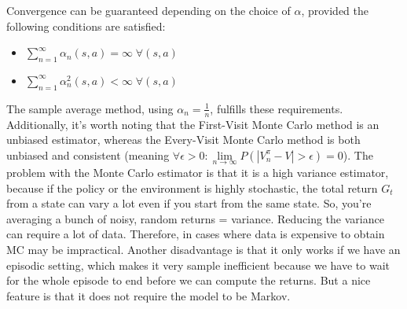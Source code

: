 Convergence can be guaranteed depending on the choice of $\alpha$, provided the 
following conditions are satisfied:
\begin{itemize}
\item $\sum_{n=1}^{\infty} \alpha_n(s,a) = \infty \;\forall (s,a)$
\item $\sum_{n=1}^{\infty} \alpha_n^2(s,a) < \infty \;\forall (s,a)$            
\end{itemize}
The sample average method, using $\alpha_n = \frac{1}{n}$, fulfills these requirements. 
Additionally, it’s worth noting that the First-Visit Monte Carlo method is an unbiased 
estimator, whereas the Every-Visit Monte Carlo method is both unbiased and consistent
(meaning $\forall \epsilon > 0: \lim\limits_{n\rightarrow\infty} P(|V_n^{\pi}-V|> \epsilon)= 0$).\newline
The problem with the Monte Carlo estimator is that it is a high variance estimator, because if the 
policy or the environment is highly stochastic, the total return $G_t$ from a state can vary a lot 
even if you start from the same state. So, you're 
averaging a bunch of noisy, random returns = variance.
Reducing the variance can require a lot of data. Therefore, in cases where data is 
expensive to obtain MC may be impractical. Another 
disadvantage is that it only works if we have an episodic setting, which makes it 
very sample inefficient because we have to wait for the whole episode to end before we can 
compute the returns. But a nice feature is that it does not require the model to be 
Markov.

